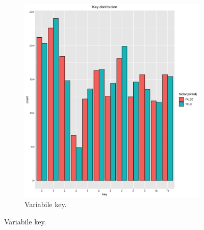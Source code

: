 \begin{figure}[!h]

	\begin{subfigure}[b]{\textwidth}
		\centering
		\includegraphics[width=10cm]{../images/key_distribution.png}
		\caption{Variabile key.}
	\end{subfigure}
      

\end{figure}
